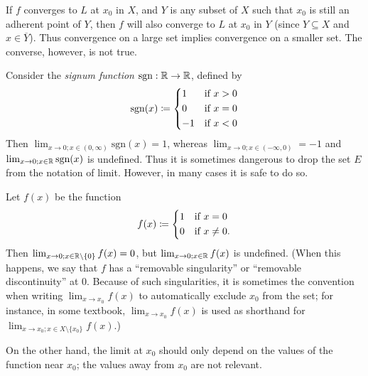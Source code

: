\begin{note}
  If \(f\) converges to \(L\) at \(x_0\) in \(X\), and \(Y\) is any subset of \(X\) such that \(x_0\) is still an adherent point of \(Y\), then \(f\) will also converge to \(L\) at \(x_0\) in \(Y\)
  (since \(Y \subseteq X\) and \(x \in \overline{Y}\)).
  Thus convergence on a large set implies convergence on a smaller set.
  The converse, however, is not true.
\end{note}

\begin{eg}\label{9.3.16}
  Consider the \emph{signum function} \(\text{sgn} : \mathbb{R} \to \mathbb{R}\), defined by
  \[
    \text{sgn}(x) \coloneqq \begin{dcases}
      1  & \text{if } x > 0 \\
      0  & \text{if } x = 0 \\
      -1 & \text{if } x < 0
    \end{dcases}
  \]
  Then \(\lim_{x \to 0 ; x \in (0, \infty)} \text{sgn}(x) = 1\), whereas \(\lim_{x \to 0 ; x \in (-\infty, 0)} = -1\) and \(\lim_{x \to 0 ; x \in \mathbb{R}} \text{sgn}(x)\) is undefined.
  Thus it is sometimes dangerous to drop the set \(E\) from the notation of limit.
  However, in many cases it is safe to do so.
\end{eg}

\begin{eg}\label{9.3.17}
  Let \(f(x)\) be the function
  \[
    f(x) \coloneqq \begin{dcases}
      1 & \text{if } x = 0     \\
      0 & \text{if } x \neq 0.
    \end{dcases}
  \]
  Then \(\lim_{x \to 0 ; x \in \mathbb{R} \setminus \{0\}} f(x) = 0\), but \(\lim_{x \to 0 ; x \in \mathbb{R}} f(x)\) is undefined.
  (When this happens, we say that \(f\) has a ``removable singularity'' or ``removable discontinuity'' at \(0\).
  Because of such singularities, it is sometimes the convention when writing \(\lim_{x \to x_0} f(x)\) to automatically exclude \(x_0\) from the set;
  for instance, in some textbook, \(\lim_{x \to x_0} f(x)\) is used as shorthand for \(\lim_{x \to x_0 ; x \in X \setminus \{x_0\}} f(x)\).)
\end{eg}

\begin{note}
  On the other hand, the limit at \(x_0\) should only depend on the values of the function near \(x_0\);
  the values away from \(x_0\) are not relevant.
\end{note}

